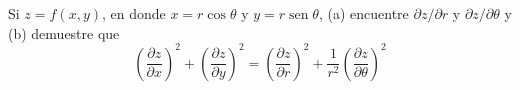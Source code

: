 \item Si $z = f(x, y)$, en donde $x = r \cos \theta$ y $y = r \operatorname{sen} \theta$, (a) encuentre $\partial z/\partial r$ y $\partial z/\partial \theta$ y (b) demuestre que
\[ \left( \frac{\partial z}{\partial x} \right)^2 + \left( \frac{\partial z}{\partial y} \right)^2 = \left( \frac{\partial z}{\partial r} \right)^2 + \frac{1}{r^2} \left( \frac{\partial z}{\partial \theta} \right)^2 \]
